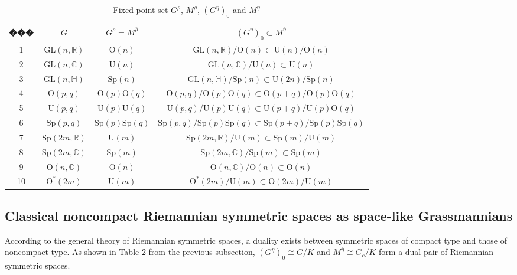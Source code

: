 \documentclass{article}
\begin{document}
\begin{table}[htbp]
\centering
\caption{Fixed point set $G^{\rho}$, $M^{\bar{\rho}}$, $(G^{\eta})_0$ and $M^{\bar{\eta}}$}
\renewcommand\arraystretch{1.6} %
\begin{tabular}{|c|c|c|c|}
\hline
��� & $G$ & $G^{\rho}= M^{\bar{\rho}}$ & $(G^{\eta})_0 \subset M^{\bar{\eta}}$ \\
\hline
1 & $\mathrm{GL}(n,\mathbb{R})$ & $\mathrm{O}(n)$ & $\mathrm{GL}(n,\mathbb{R})/\mathrm{O}(n)\subset \mathrm{U}(n)/\mathrm{O}(n)$ \\
\hline
2 & $\mathrm{GL}(n,\mathbb{C})$ & $\mathrm{U}(n)$ & $\mathrm{GL}(n,\mathbb{C})/\mathrm{U}(n)\subset \mathrm{U}(n)$ \\
\hline
3 & $\mathrm{GL}(n,\mathbb{H})$ & $\mathrm{Sp}(n)$ & $\mathrm{GL}(n,\mathbb{H})/\mathrm{Sp}(n)\subset \mathrm{U}(2n)/\mathrm{Sp}(n)$ \\
\hline
4 & $\mathrm{O}(p, q)$ & $\mathrm{O}(p)\mathrm{O}(q)$ & $\mathrm{O}(p, q)/\mathrm{O}(p)\mathrm{O}(q)\subset \mathrm{O}(p+q)/\mathrm{O}(p)\mathrm{O}(q)$ \\
\hline
5 & $\mathrm{U}(p, q)$ & $\mathrm{U}(p)\mathrm{U}(q)$ & $\mathrm{U}(p, q)/\mathrm{U}(p)\mathrm{U}(q)\subset \mathrm{U}(p+q)/\mathrm{U}(p)\mathrm{O}(q)$ \\
\hline
6 & $\mathrm{Sp}(p, q)$ & $\mathrm{Sp}(p)\mathrm{Sp}(q)$ & $\mathrm{Sp}(p, q)/\mathrm{Sp}(p)\mathrm{Sp}(q)\subset \mathrm{Sp}(p+q)/\mathrm{Sp}(p)\mathrm{Sp}(q)$ \\
\hline
7 & $\mathrm{Sp}(2m, \mathbb{R})$ & $\mathrm{U}(m)$ & $\mathrm{Sp}(2m, \mathbb{R})/\mathrm{U}(m)\subset \mathrm{Sp}(m)/\mathrm{U}(m)$ \\
\hline
8 & $\mathrm{Sp}(2m, \mathbb{C})$ & $\mathrm{Sp}(m)$ & $\mathrm{Sp}(2m, \mathbb{C})/\mathrm{Sp}(m)\subset \mathrm{Sp}(m)$ \\
\hline
9 & $\mathrm{O}(n,\mathbb{C})$ & $\mathrm{O}(n)$ & $\mathrm{O}(n,\mathbb{C})/\mathrm{O}(n)\subset \mathrm{O}(n)$ \\
\hline
10 & $\mathrm{O}^*(2m)$ & $\mathrm{U}(m)$ & $\mathrm{O}^*(2m)/\mathrm{U}(m)\subset \mathrm{O}(2m)/\mathrm{U}(m)$ \\
\hline
\end{tabular}
\end{table}


\subsection{Classical noncompact Riemannian symmetric spaces as space-like Grassmannians}
According to the general theory of Riemannian symmetric spaces, a duality exists between symmetric spaces of compact type and those of noncompact type.
As shown in Table 2 from the previous subsection, $(G^{\eta})_0 \cong G/K$ and $M^{\bar{\eta}} \cong G_c/K$ form a dual pair of Riemannian symmetric spaces.
\end{document}
